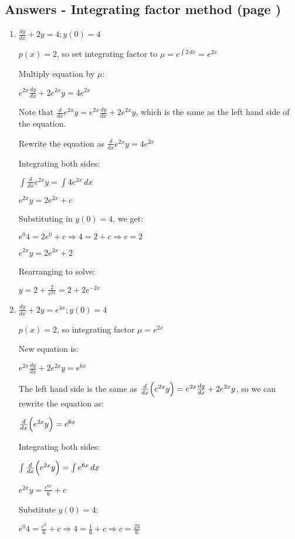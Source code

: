 \documentclass[../main.tex]{subfiles}
\begin{document}
\subsection*{Answers - Integrating factor method (page \pageref{Integrating factor method})}
\label{Integrating factor answers}
\begin{enumerate}[itemsep=0.7cm]
    \item 
    $\frac{dy}{dx}+2y=4; y(0)=4$

    $p(x)=2$, so set integrating factor to $\mu=e^{\int 2\,dx}=e^{2x}$

    Multiply equation by $\mu$:

    $e^{2x}\frac{dy}{dx}+2e^{2x}y=4e^{2x}$

    Note that $\frac{d}{dx}e^{2x}y=e^{2x}\frac{dy}{dx}+2e^{2x}y$, which is the same as the left hand side of the equation.

    Rewrite the equation as $\frac{d}{dx}e^{2x}y=4e^{2x}$

    Integrating both sides:

    $\int \frac{d}{dx}e^{2x}y=\int 4e^{2x}\,dx$

    $e^{2x}y=2e^{2x}+c$

    Substituting in $y(0)=4$, we get:

    $e^{0}4=2e^{0}+c \Rightarrow 4=2+c \Rightarrow c=2$

    $e^{2x}y=2e^{2x}+2$

    Rearranging to solve:

    $y=2+\frac{2}{e^{2x}}=2+2e^{-2x}$


    \item 
    $\frac{dy}{dx}+2y=e^{4x}; y(0)=4$

    $p(x)=2$, so integrating factor $\mu=e^{2x}$

    New equation is:

    $e^{2x}\frac{dy}{dx}+2e^{2x}y=e^{6x}$

    The left hand side is the same as $\frac{d}{dx}\Bigl(e^{2x}y\Bigr)=e^{2x}\frac{dy}{dx}+2e^{2x}y$, so we can rewrite the equation as:

    $\frac{d}{dx}\Bigl(e^{2x}y\Bigr)=e^{6x}$

    Integrating both sides:

    $\int \frac{d}{dx}\Bigl(e^{2x}y\Bigr)=\int e^{6x}\,dx$

    $e^{2x}y=\frac{e^{6x}}{6}+c$

    Substitute $y(0)=4$:

    $e^{0}4=\frac{e^{0}}{6}+c \Rightarrow 4=\frac{1}{6}+c \Rightarrow c=\frac{23}{6}$


\end{enumerate}
\end{document}
